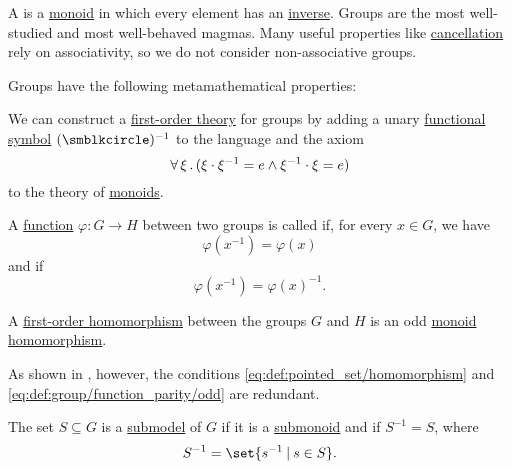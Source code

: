 \begin{definition}\label{def:group}
  A  is a \hyperref[def:monoid]{monoid} in which every element has an \hyperref[def:monoid_inverse_element]{inverse}. Groups are the most well-studied and most well-behaved magmas. Many useful properties like \hyperref[thm:def:group/properties/cancellative]{cancellation} rely on associativity, so we do not consider non-associative groups.

  Groups have the following metamathematical properties:
  \begin{thmenum}
     We can construct a \hyperref[def:first_order_theory]{first-order theory} for groups by adding a unary \hyperref[def:first_order_language/func]{functional symbol} \( (\anon)^{-1} \) to the language and the axiom
    \begin{equation}\label{eq:def:group/theory/inverse_axiom}
      \forall \thinspace \xi \thinspace . \thinspace (\xi \cdot \xi^{-1} = e \wedge \xi^{-1} \cdot \xi = e)
    \end{equation}
    to the theory of \hyperref[def:monoid]{monoids}.

     A \hyperref[def:function]{function} \( \varphi: G \to H \) between two groups is called  if, for every \( x \in G \), we have
    \begin{equation}\label{eq:def:group/function_parity/even}
      \varphi(x^{-1}) = \varphi(x)
    \end{equation}
    and  if
    \begin{equation}\label{eq:def:group/function_parity/odd}
      \varphi(x^{-1}) = \varphi(x)^{-1}.
    \end{equation}

     A \hyperref[def:first_order_homomorphism]{first-order homomorphism} between the groups \( G \) and \( H \) is an odd \hyperref[def:monoid/homomorphism]{monoid homomorphism}.

    As shown in , however, the conditions \eqref{eq:def:pointed_set/homomorphism} and \eqref{eq:def:group/function_parity/odd} are redundant.

     The set \( S \subseteq G \) is a \hyperref[thm:substructure_is_model]{submodel} of \( G \) if it is a \hyperref[def:monoid/submodel]{submonoid} and if \( S^{-1} = S \), where
    \begin{equation*}
      S^{-1} = \set{ s^{-1} \given s \in S }.
    \end{equation*}


\end{thmenum}
\end{definition}
